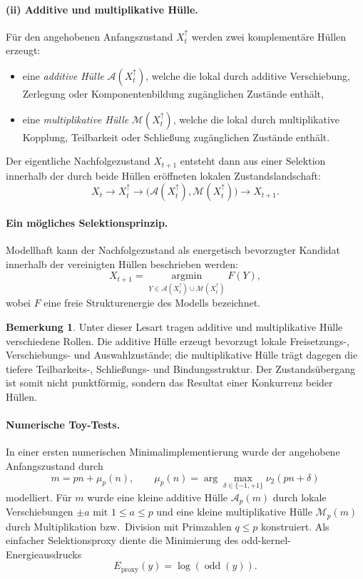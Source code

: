 \documentclass[11pt,a4paper]{article}
\theoremstyle{definition}
\newtheorem{bemerkung}{Bemerkung}
\begin{document}
\paragraph{(ii) Additive und multiplikative Hülle.}
Für den angehobenen Anfangszustand \(X_t^\uparrow\) werden zwei komplementäre Hüllen erzeugt:
\begin{itemize}
	\item eine \emph{additive Hülle} \(\mathcal{A}(X_t^\uparrow)\), welche die lokal durch additive Verschiebung, Zerlegung oder Komponentenbildung zugänglichen Zustände enthält,
	\item eine \emph{multiplikative Hülle} \(\mathcal{M}(X_t^\uparrow)\), welche die lokal durch multiplikative Kopplung, Teilbarkeit oder Schließung zugänglichen Zustände enthält.
\end{itemize}

Der eigentliche Nachfolgezustand \(X_{t+1}\) entsteht dann aus einer Selektion innerhalb der durch beide Hüllen eröffneten lokalen Zustandslandschaft:
\[
X_t \longrightarrow X_t^\uparrow \longrightarrow \bigl(\mathcal{A}(X_t^\uparrow),\mathcal{M}(X_t^\uparrow)\bigr) \longrightarrow X_{t+1}.
\]

\paragraph{Ein mögliches Selektionsprinzip.}
Modellhaft kann der Nachfolgezustand als energetisch bevorzugter Kandidat innerhalb der vereinigten Hüllen beschrieben werden:
\[
X_{t+1}
=
\operatorname*{argmin}_{Y\in \mathcal{A}(X_t^\uparrow)\cup \mathcal{M}(X_t^\uparrow)}
F(Y),
\]
wobei \(F\) eine freie Strukturenergie des Modells bezeichnet.

\begin{bemerkung}
	Unter dieser Lesart tragen additive und multiplikative Hülle verschiedene Rollen. Die additive Hülle erzeugt bevorzugt lokale Freisetzungs-, Verschiebungs- und Auswahlzustände; die multiplikative Hülle trägt dagegen die tiefere Teilbarkeits-, Schließungs- und Bindungsstruktur. Der Zustandsübergang ist somit nicht punktförmig, sondern das Resultat einer Konkurrenz beider Hüllen.
\end{bemerkung}

\paragraph{Numerische Toy-Tests.}
In einer ersten numerischen Minimalimplementierung wurde der angehobene Anfangszustand durch
\[
m=pn+\mu_p(n),
\qquad
\mu_p(n)=\arg\max_{\delta\in\{-1,+1\}}\nu_2(pn+\delta)
\]
modelliert. Für \(m\) wurde eine kleine additive Hülle \(\mathcal{A}_p(m)\) durch lokale Verschiebungen \(\pm a\) mit \(1\le a\le p\) und eine kleine multiplikative Hülle \(\mathcal{M}_p(m)\) durch Multiplikation bzw.\ Division mit Primzahlen \(q\le p\) konstruiert. Als einfacher Selektionsproxy diente die Minimierung des odd-kernel-Energieausdrucks
\[
E_{\mathrm{proxy}}(y)=\log(\operatorname{odd}(y)).
\]
\end{document}
